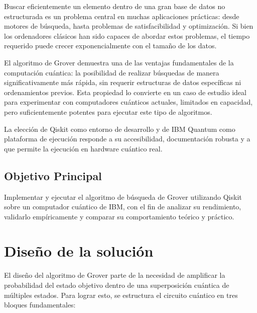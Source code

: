 \documentclass{article}
\begin{document}
Buscar eficientemente un elemento dentro de una gran base de datos no estructurada es un problema central en muchas aplicaciones prácticas: desde motores de búsqueda, hasta problemas de satisfacibilidad y optimización. Si bien los ordenadores clásicos han sido capaces de abordar estos problemas, el tiempo requerido puede crecer exponencialmente con el tamaño de los datos.

El algoritmo de Grover demuestra una de las ventajas fundamentales de la computación cuántica: la posibilidad de realizar búsquedas de manera significativamente más rápida, sin requerir estructuras de datos específicas ni ordenamientos previos. Esta propiedad lo convierte en un caso de estudio ideal para experimentar con computadores cuánticos actuales, limitados en capacidad, pero suficientemente potentes para ejecutar este tipo de algoritmos.

La elección de Qiskit como entorno de desarrollo y de IBM Quantum como plataforma de ejecución responde a su accesibilidad, documentación robusta y a que permite la ejecución en hardware cuántico real.

\subsection{Objetivo Principal}

Implementar y ejecutar el algoritmo de búsqueda de Grover utilizando Qiskit sobre un computador cuántico de IBM, con el fin de analizar su rendimiento, validarlo empíricamente y comparar su comportamiento teórico y práctico.

\section{Diseño de la solución}\label{sec:dis}

El diseño del algoritmo de Grover parte de la necesidad de amplificar la probabilidad del estado objetivo dentro de una superposición cuántica de múltiples estados. Para lograr esto, se estructura el circuito cuántico en tres bloques fundamentales:
\end{document}

